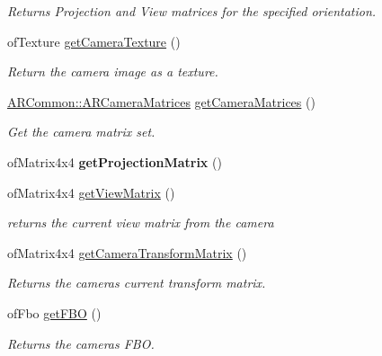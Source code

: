 \begin{DoxyCompactItemize}
\begin{DoxyCompactList}\small\item\em Returns Projection and View matrices for the specified orientation. \end{DoxyCompactList}\item 
\mbox{\label{class_a_r_processor_a5eb8045000bc6e0ad3d41d7bbf832047}} 
of\+Texture \hyperlink{class_a_r_processor_a5eb8045000bc6e0ad3d41d7bbf832047}{get\+Camera\+Texture} ()
\begin{DoxyCompactList}\small\item\em Return the camera image as a texture. \end{DoxyCompactList}\item 
\mbox{\label{class_a_r_processor_a82a9b334360ebccd844e7cf5584eff8b}} 
\hyperlink{struct_a_r_common_1_1_a_r_camera_matrices}{A\+R\+Common\+::\+A\+R\+Camera\+Matrices} \hyperlink{class_a_r_processor_a82a9b334360ebccd844e7cf5584eff8b}{get\+Camera\+Matrices} ()
\begin{DoxyCompactList}\small\item\em Get the camera matrix set. \end{DoxyCompactList}\item 
\mbox{\label{class_a_r_processor_a0f7cf764c73a8fc3964be088156766ea}} 
of\+Matrix4x4 {\bfseries get\+Projection\+Matrix} ()
\item 
\mbox{\label{class_a_r_processor_a2e1d4cde9029bad28ac797c94e73096a}} 
of\+Matrix4x4 \hyperlink{class_a_r_processor_a2e1d4cde9029bad28ac797c94e73096a}{get\+View\+Matrix} ()
\begin{DoxyCompactList}\small\item\em returns the current view matrix from the camera \end{DoxyCompactList}\item 
\mbox{\label{class_a_r_processor_aea093b6d054daa0c75de6f7a492a19ff}} 
of\+Matrix4x4 \hyperlink{class_a_r_processor_aea093b6d054daa0c75de6f7a492a19ff}{get\+Camera\+Transform\+Matrix} ()
\begin{DoxyCompactList}\small\item\em Returns the camera\textquotesingle{}s current transform matrix. \end{DoxyCompactList}\item 
\mbox{\label{class_a_r_processor_a8436dc786e91fb933879d90a4ab396d5}} 
of\+Fbo \hyperlink{class_a_r_processor_a8436dc786e91fb933879d90a4ab396d5}{get\+F\+BO} ()
\begin{DoxyCompactList}\small\item\em Returns the camera\textquotesingle{}s F\+BO. \end{DoxyCompactList}\end{DoxyCompactItemize}
